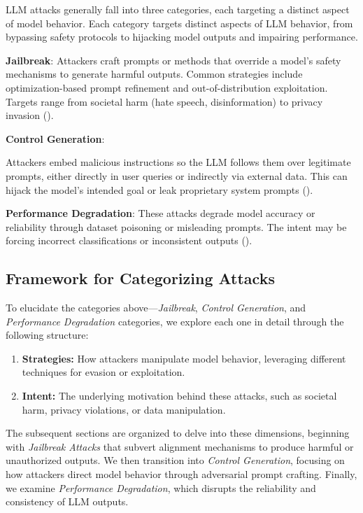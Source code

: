 LLM attacks generally fall into three categories, each targeting a distinct aspect of model behavior. 
Each category targets distinct aspects of LLM behavior, from bypassing safety protocols to hijacking model outputs and impairing performance.

\textbf{Jailbreak}:
Attackers craft prompts or methods that override a model’s safety mechanisms to generate harmful outputs. Common strategies include optimization-based prompt refinement and out-of-distribution exploitation. Targets range from societal harm (hate speech, disinformation) to privacy invasion (\cite{wu2024llms,pair23,tap23,johnny24,dan23,ascii24}).

\textbf{Control Generation}:

Attackers embed malicious instructions so the LLM follows them over legitimate prompts, either directly in user queries or indirectly via external data. This can hijack the model’s intended goal or leak proprietary system prompts (\cite{ignore_previous_prompt,greshake_indirect}).

\textbf{Performance Degradation}:
These attacks degrade model accuracy or reliability through dataset poisoning or misleading prompts. The intent may be forcing incorrect classifications or inconsistent outputs (\cite{greshake_indirect}).

\subsection{Framework for Categorizing Attacks}

To elucidate the categories above—\textit{Jailbreak}, \textit{Control Generation}, and \textit{Performance Degradation} categories, we explore each one in detail through the following structure:
\begin{enumerate}
    \item \textbf{Strategies:} How attackers manipulate model behavior, leveraging different techniques for evasion or exploitation.
    \item \textbf{Intent:} The underlying motivation behind these attacks, such as societal harm, privacy violations, or data manipulation.
\end{enumerate}

The subsequent sections are organized to delve into these dimensions, beginning with \textit{Jailbreak Attacks} that subvert alignment mechanisms to produce harmful or unauthorized outputs. We then transition into \textit{Control Generation}, focusing on how attackers direct model behavior through adversarial prompt crafting. Finally, we examine \textit{Performance Degradation}, which disrupts the reliability and consistency of LLM outputs.

